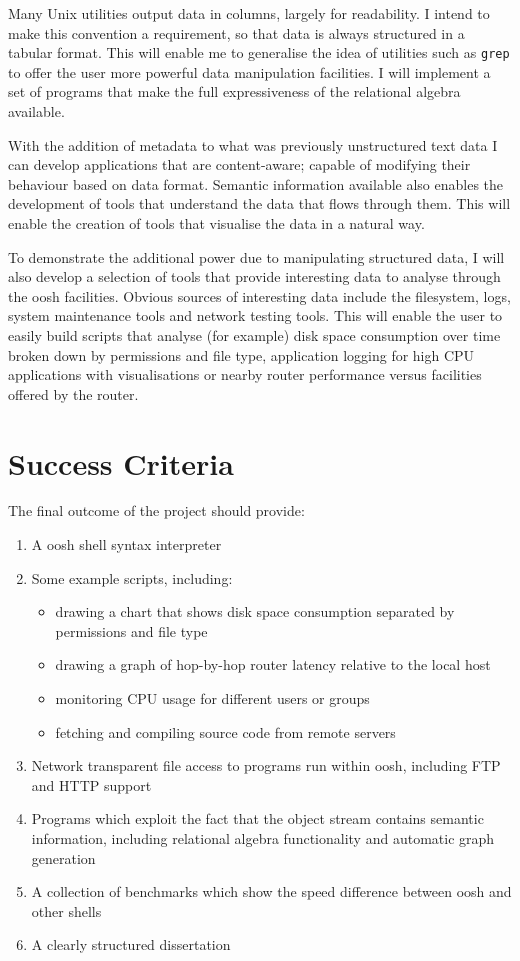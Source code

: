 \documentclass[12pt]{article}
\begin{document}
Many Unix utilities output data in columns, largely for readability. I
intend to make this convention a requirement, so that data is always
structured in a tabular format. This will enable me to generalise the
idea of utilities such as \texttt{grep} to offer the user more powerful data
manipulation facilities. I will implement a set of programs that make
the full expressiveness of the relational algebra available.

With the addition of metadata to what was previously unstructured text
data I can develop applications that are content-aware; capable of
modifying their behaviour based on data format. Semantic information
available also enables the development of tools that understand the
data that flows through them. This will enable the creation of tools
that visualise the data in a natural way.

To demonstrate the additional power due to manipulating structured
data, I will also develop a selection of tools that provide
interesting data to analyse through the oosh facilities. Obvious
sources of interesting data include the filesystem, logs, system
maintenance tools and network testing tools. This will enable the user
to easily build scripts that analyse (for example) disk space
consumption over time broken down by permissions and file type,
application logging for high CPU applications with visualisations or
nearby router performance versus facilities offered by the router.

\section*{Success Criteria}
The final outcome of the project should provide:

\begin{enumerate}
\item A oosh shell syntax interpreter
\item Some example scripts, including:
  \begin{itemize}
  \item drawing a chart that shows disk space consumption separated by
    permissions and file type
  \item drawing a graph of hop-by-hop router latency relative to the
    local host
  \item monitoring CPU usage for different users or groups
  \item fetching and compiling source code from remote servers
  \end{itemize}
\item Network transparent file access to programs run within oosh,
  including FTP and HTTP support
\item Programs which exploit the fact that the object stream
  contains semantic information, including relational algebra
  functionality and automatic graph generation
\item A collection of benchmarks which show the speed difference
  between oosh and other shells
\item A clearly structured dissertation
\end{enumerate}
\end{document}
